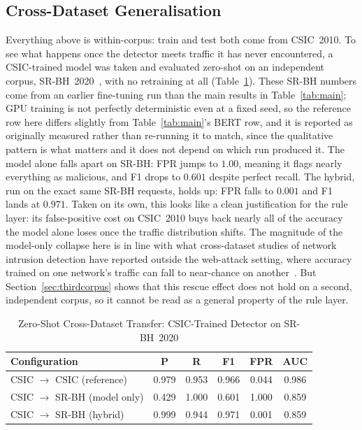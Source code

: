 \documentclass[conference]{IEEEtran}
\begin{document}
\subsection{Cross-Dataset Generalisation}
\label{sec:crossdataset}
Everything above is within-corpus: train and test both come from
CSIC~2010. To see what happens once the detector meets traffic it has
never encountered, a CSIC-trained model was taken and evaluated
zero-shot on an independent corpus, SR-BH~2020~\cite{srbh2020}, with no
retraining at all (Table~\ref{tab:crossdataset}). These SR-BH numbers
come from an earlier fine-tuning run than the main results in
Table~\ref{tab:main}; GPU training is not perfectly deterministic even
at a fixed seed, so the reference row here differs slightly from
Table~\ref{tab:main}'s BERT row, and it is reported as originally measured
rather than re-running it to match, since the qualitative pattern is
what matters and it does not depend on which run produced it. The model
alone falls apart on SR-BH: FPR jumps to $1.00$, meaning it flags nearly
everything as malicious, and F1 drops to $0.601$ despite perfect recall.
The hybrid, run on the exact same SR-BH requests, holds up: FPR falls to
$0.001$ and F1 lands at $0.971$. Taken on its own, this looks like a
clean justification for the rule layer: its false-positive cost on
CSIC~2010 buys back nearly all of the accuracy the model alone loses
once the traffic distribution shifts. The magnitude of the model-only
collapse here is in line with what cross-dataset studies of network
intrusion detection have reported outside the web-attack setting, where
accuracy trained on one network's traffic can fall to near-chance on
another~\cite{cantone2024crossdataset,venkatesan2026crossdataset}. But
Section~\ref{sec:thirdcorpus} shows that this rescue effect does not
hold on a second, independent corpus, so it cannot be read as a general
property of the rule layer.

\begin{table}[t]
\centering
\caption{Zero-Shot Cross-Dataset Transfer: CSIC-Trained Detector on SR-BH~2020}
\label{tab:crossdataset}
\begin{tabular}{@{}lccccc@{}}
\toprule
Configuration & P & R & F1 & FPR & AUC \\
\midrule
CSIC $\to$ CSIC (reference) & 0.979 & 0.953 & 0.966 & 0.044 & 0.986 \\
CSIC $\to$ SR-BH (model only) & 0.429 & 1.000 & 0.601 & 1.000 & 0.859 \\
CSIC $\to$ SR-BH (hybrid) & 0.999 & 0.944 & 0.971 & 0.001 & 0.859 \\
\bottomrule
\end{tabular}
\end{table}
\end{document}
